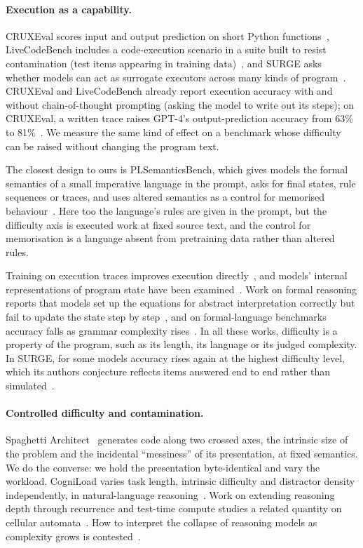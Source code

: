 \documentclass[10pt]{article}
\begin{document}
\paragraph{Execution as a capability.} CRUXEval scores input and output prediction on short Python
functions~\citep{gu2024cruxeval}, LiveCodeBench includes a code-execution scenario in a
suite built to resist contamination (test items appearing in training data)~\citep{jain2024livecodebench}, and SURGE asks whether
models can act as surrogate executors across many kinds of program~\citep{lyu2025surge}.
CRUXEval and LiveCodeBench already report execution accuracy with and without
chain-of-thought prompting (asking the model to write out its steps); on CRUXEval, a
written trace raises GPT-4's output-prediction accuracy from 63\% to
81\%~\citep{gu2024cruxeval, jain2024livecodebench}. We measure the same kind of effect
on a benchmark whose difficulty can be raised without changing the program text.

The closest design to ours is PLSemanticsBench, which gives models the formal semantics
of a small imperative language in the prompt, asks for final states, rule sequences or
traces, and uses altered semantics as a control for memorised
behaviour~\citep{thimmaiah2026plsemanticsbench}. Here too the language's rules are given
in the prompt, but the difficulty axis is executed work at fixed source text, and the
control for memorisation is a language absent from pretraining data rather than altered
rules.

Training on execution traces improves execution directly~\citep{armengol2025execute},
and models' internal representations of program state have been
examined~\citep{jin2023semantics}. Work on formal reasoning reports that models set up
the equations for abstract interpretation correctly but fail to update the state step by
step~\citep{mitchell2025abstract}, and on formal-language benchmarks accuracy falls as
grammar complexity rises~\citep{dong2026chomsky}. In all these works, difficulty is a
property of the program, such as its length, its language or its judged complexity. In
SURGE, for some models accuracy rises again at the highest difficulty level, which its
authors conjecture reflects items answered end to end rather than
simulated~\citep{lyu2025surge}.

\paragraph{Controlled difficulty and contamination.} Spaghetti Architect~\citep{ji2026spaghetti} generates
code along two crossed axes, the intrinsic size of the problem and the incidental
``messiness'' of its presentation, at fixed semantics. We do the converse: we hold the
presentation byte-identical and vary the workload. CogniLoad varies task length,
intrinsic difficulty and distractor density independently, in natural-language
reasoning~\citep{kaiser2025cogniload}.
Work on extending reasoning depth through recurrence and test-time compute studies a
related quantity on cellular automata~\citep{rodkin2025beyond}. How to interpret the
collapse of reasoning models as complexity grows is
contested~\citep{shojaee2025illusion, lawsen2025comment}.
\end{document}
